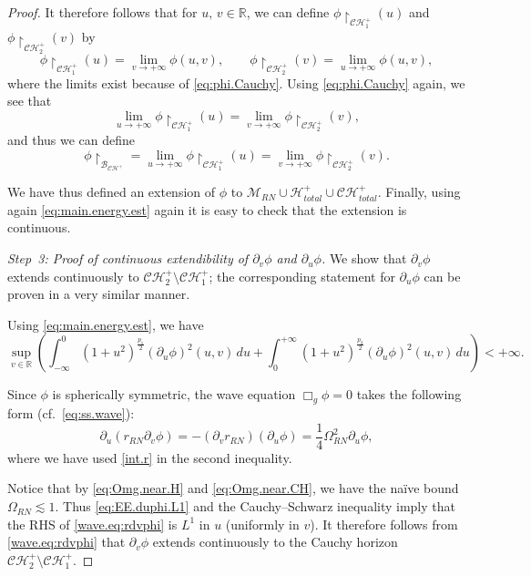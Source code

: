 \documentclass[10pt, reqno]{amsart}
\theoremstyle{definition}
\theoremstyle{remark}
\numberwithin{equation}{section}
\def\ls{\lesssim}
\newcommand{\rd}{\partial}
\newcommand{\0}{\emptyset}
\newcommand{\Omg}{\Omega}
\newcommand{\calC}{\mathcal C}
\newcommand{\calH}{\mathcal H}
\newcommand{\f}{\frac}
\newcommand{\CH}{\calC \calH^{+}}		%
\newcommand{\EH}{\calH^{+}}
\newcommand{\pfstep}[1]{\vspace{.5em} {\it #1.}}
\begin{document}
\begin{proof}
It therefore follows that for $u,\,v\in \mathbb R$, we can define 
$\phi \restriction_{\CH_1}(u)$ and $\phi \restriction_{\CH_2}(v)$ by
$$ \phi \restriction_{\CH_1}(u) = \lim_{v\to +\infty} \phi(u,v),\qquad \phi \restriction_{\CH_2}(v) = \lim_{u\to +\infty} \phi(u,v),$$
where the limits exist because of \eqref{eq:phi.Cauchy}. Using \eqref{eq:phi.Cauchy} again, we see that
$$ \lim_{u\to +\infty} \phi \restriction_{\CH_1}(u) = \lim_{v\to +\infty} \phi \restriction_{\CH_2}(v),$$
and thus we can define
$$\phi \restriction_{\mathcal B_{\CH}} = \lim_{u\to +\infty} \phi \restriction_{\CH_1}(u) = \lim_{v\to +\infty} \phi \restriction_{\CH_2}(v).$$

We have thus defined an extension of $\phi$ to $\mathcal M_{RN} \cup \EH_{total} \cup \CH_{total}$. Finally, using again \eqref{eq:main.energy.est} again it is easy to check that the extension is continuous.

\pfstep{Step~3: Proof of continuous extendibility of $\rd_v\phi$ and $\rd_u\phi$} We show that $\rd_v\phi$ extends continuously to $\CH_2 \setminus \CH_1$; the corresponding statement for $\rd_u\phi$ can be proven in a very similar manner.

Using \eqref{eq:main.energy.est}, we have
\begin{equation}\label{eq:EE.duphi.L1}
\sup_{v\in \mathbb R} \left( \int_{-\infty}^0 (1+u^2)^{\f{p_1}2} (\rd_u\phi)^2(u,v) \, du + \int_0^{+\infty} (1+ u^2)^{\f {p_2}2} (\rd_u\phi)^2(u,v) \, du \right) < +\infty.
\end{equation}


Since $\phi$ is spherically symmetric, the wave equation $\Box_g\phi = 0$ takes the following form (cf.~\eqref{eq:ss.wave}):
\begin{equation}\label{wave.eq:rdvphi}
\rd_u (r_{RN}\rd_v\phi) = -(\rd_v r_{RN})(\rd_u\phi) = \f 14\Omg^2_{RN} \rd_u\phi,
\end{equation}
where we have used \eqref{int.r} in the second inequality.


Notice that by \eqref{eq:Omg.near.H} and \eqref{eq:Omg.near.CH}, we have the na\"ive bound $\Omg_{RN} \ls 1$. Thus \eqref{eq:EE.duphi.L1} and the Cauchy--Schwarz inequality imply that the RHS of \eqref{wave.eq:rdvphi} is $L^1$ in $u$ (uniformly in $v$). It therefore follows from \eqref{wave.eq:rdvphi} that $\rd_v\phi$ extends continuously to the Cauchy horizon $\CH_2\setminus \CH_1$.




\end{proof}
\end{document}
